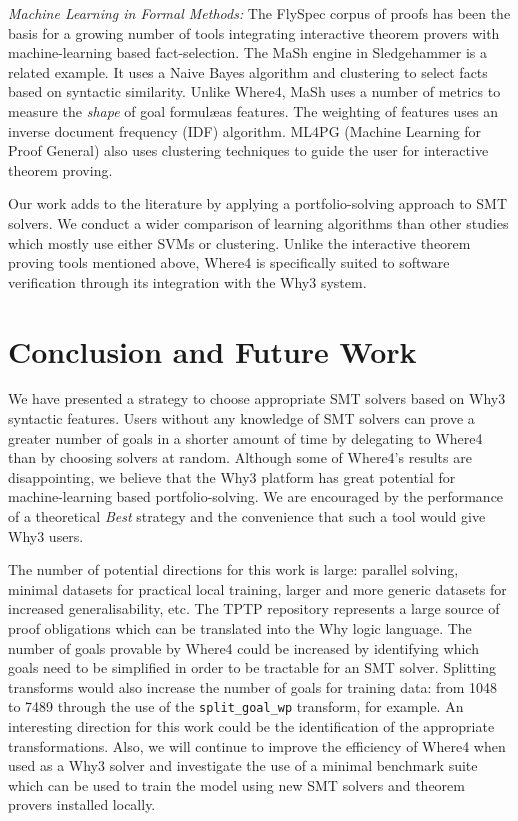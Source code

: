 \documentclass[submission,copyright,creativecommons]{eptcs}
\begin{document}
\textit{Machine Learning in Formal Methods:} 
The FlySpec \cite{Flyspec} corpus of proofs has been the basis for a growing number of tools integrating interactive theorem provers with machine-learning based fact-selection. The MaSh engine in Sledgehammer \cite{Sledgehammer} is a related example. It uses a Naive Bayes algorithm and clustering to select facts based on syntactic similarity. 
Unlike \textsf{Where4}, MaSh uses a number of metrics to measure the \textit{shape} of goal formul\ae as features. 
The weighting of features uses an inverse document frequency (IDF) algorithm.
ML4PG (Machine Learning for Proof General) \cite{ML4PG} also uses clustering techniques to guide the user for interactive theorem proving.

Our work adds to the literature by applying a portfolio-solving approach to SMT solvers. We conduct a wider comparison of learning algorithms than other studies which mostly use either SVMs or clustering. Unlike the interactive theorem proving tools mentioned above, \textsf{Where4} is specifically suited to software verification through its integration with the \textsf{Why3} system.

\section{Conclusion and Future Work}

We have presented a strategy to choose appropriate SMT solvers based on \textsf{Why3} syntactic features. Users without any knowledge of SMT solvers can prove a greater number of goals in a shorter amount of time by delegating to \textsf{Where4} than by choosing solvers at random. Although some of \textsf{Where4}'s results are disappointing, we believe that the \textsf{Why3} platform has great potential for machine-learning based portfolio-solving. We are encouraged by the performance of a theoretical \textit{Best} strategy and the convenience that such a tool would give \textsf{Why3} users.

The number of potential directions for this work is large: parallel solving, minimal datasets for practical local training, larger and more generic datasets for increased generalisability, etc. 
The TPTP repository represents a large source of proof obligations which can be translated into the Why logic language. The number of goals provable by \textsf{Where4} could be increased by identifying which goals need to be simplified in order to be tractable for an SMT solver. Splitting transforms would also increase the number of goals for training data: from 1048 to 7489 through the use of the \texttt{split\_goal\_wp} transform, for example.  An interesting direction for this work could be the identification of the appropriate transformations. Also, we will continue to improve the efficiency of \textsf{Where4} when used as a \textsf{Why3} solver and investigate the use of a minimal benchmark suite which can be used to train the model using new SMT solvers and theorem provers installed locally.  
\end{document}
